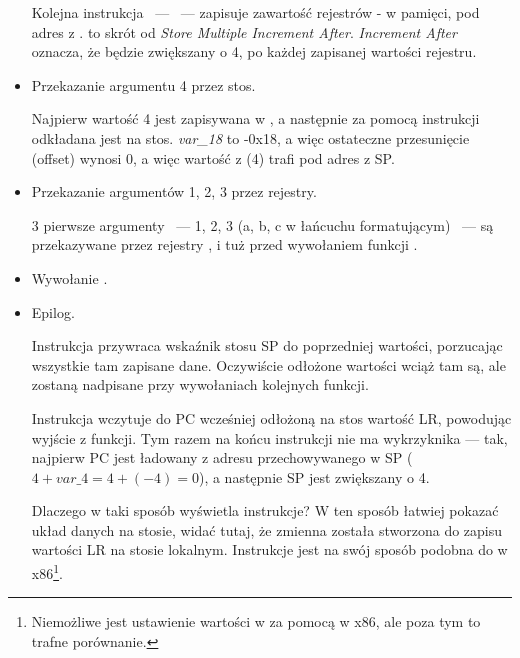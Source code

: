 \begin{itemize}
Kolejna instrukcja ~---  ~--- zapisuje zawartość rejestrów - w pamięci, pod adres z .
 to skrót od \emph{Store Multiple Increment After}.
\emph{Increment After} oznacza, że  będzie zwiększany o 4, po każdej zapisanej wartości rejestru.

\item Przekazanie argumentu 4 przez stos.

Najpierw wartość 4 jest zapisywana w , a następnie za pomocą instrukcji  odkładana jest na stos.
\emph{var\_18} to -0x18, a więc ostateczne przesunięcie (offset) wynosi 0, a więc wartość z  (4) trafi pod adres z \ac{SP}.

\item Przekazanie argumentów 1, 2, 3 przez rejestry.

3 pierwsze argumenty ~--- 1, 2, 3 (a, b, c w łańcuchu formatującym) ~--- są przekazywane przez rejestry ,  i 
tuż przed wywołaniem funkcji \printf.

\item Wywołanie \printf.

\item Epilog.

Instrukcja  przywraca wskaźnik stosu \ac{SP} do poprzedniej wartości,
porzucając wszystkie tam zapisane dane.
Oczywiście odłożone wartości wciąż tam są, ale zostaną nadpisane przy wywołaniach kolejnych funkcji.

Instrukcja  wczytuje do \ac{PC} wcześniej odłożoną na stos wartość \ac{LR}, powodując wyjście z funkcji.
Tym razem na końcu instrukcji nie ma wykrzyknika --- tak, najpierw \ac{PC} jest ładowany z adresu przechowywanego w \ac{SP}
($4+var\_4=4+(-4)=0$), a następnie \ac{SP} jest zwiększany o 4.


Dlaczego \IDA w taki sposób wyświetla instrukcje?
W ten sposób łatwiej pokazać układ danych na stosie, widać tutaj, że zmienna  została stworzona do zapisu wartości \ac{LR} na stosie lokalnym.
Instrukcje jest na swój sposób podobna do  w x86\footnote{Niemożliwe jest ustawienie wartości w  za pomocą \POP w x86, ale poza tym to trafne porównanie.}.

\end{itemize}

\myparagraph{\OptimizingKeilVI: \ThumbMode}

